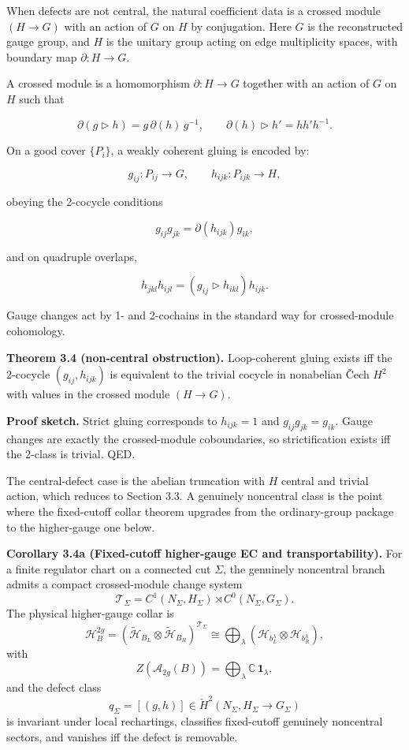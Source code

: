 When defects are not central, the natural coefficient data is a crossed module \((H \to G)\) with an action of \(G\) on \(H\) by conjugation. Here \(G\) is the reconstructed gauge group, and \(H\) is the unitary group acting on edge multiplicity spaces, with boundary map \(\partial: H \to G\).

A crossed module is a homomorphism \(\partial: H \to G\) together with an action of \(G\) on \(H\) such that

\[
\partial(g \triangleright h) = g\,\partial(h)\,g^{-1},
\qquad
\partial(h) \triangleright h' = h h' h^{-1}.
\]

On a good cover \(\{P_i\}\), a weakly coherent gluing is encoded by:

\[
g_{ij}: P_{ij} \to G,\qquad h_{ijk}: P_{ijk} \to H,
\]

obeying the 2-cocycle conditions

\[
g_{ij} g_{jk} = \partial(h_{ijk}) g_{ik},
\]

and on quadruple overlaps,

\[
h_{jkl} h_{ijl} = (g_{ij} \triangleright h_{ikl}) h_{ijk}.
\]

Gauge changes act by 1- and 2-cochains in the standard way for crossed-module cohomology.

\textbf{Theorem 3.4 (non-central obstruction).} Loop-coherent gluing exists iff the 2-cocycle \((g_{ij}, h_{ijk})\) is equivalent to the trivial cocycle in nonabelian \v{C}ech \(H^2\) with values in the crossed module \((H \to G)\).

\textbf{Proof sketch.} Strict gluing corresponds to \(h_{ijk}=1\) and \(g_{ij}g_{jk}=g_{ik}\). Gauge changes are exactly the crossed-module coboundaries, so strictification exists iff the 2-class is trivial. QED.

The central-defect case is the abelian truncation with \(H\) central and trivial action, which reduces to Section 3.3. A genuinely noncentral class is the point where the fixed-cutoff collar theorem upgrades from the ordinary-group package to the higher-gauge one below.

\textbf{Corollary 3.4a (Fixed-cutoff higher-gauge EC and transportability).} For a finite regulator chart on a connected cut \(\Sigma\), the genuinely noncentral branch admits a compact crossed-module change system
\[
\mathcal T_\Sigma
=
C^1(N_\Sigma,H_\Sigma)\rtimes C^0(N_\Sigma,G_\Sigma).
\]
The physical higher-gauge collar is
\[
\mathcal H_B^{2g}
=
(\widetilde{\mathcal H}_{B_L}\otimes \widetilde{\mathcal H}_{B_R})^{\mathcal T_\Sigma}
\cong
\bigoplus_\lambda
(\mathcal H_{b_L^\lambda}\otimes \mathcal H_{b_R^\lambda}),
\]
with
\[
Z(\mathcal A_{2g}(B))
=
\bigoplus_\lambda \mathbb C\,\mathbf 1_\lambda,
\]
and the defect class
\[
q_\Sigma=[(g,h)]\in \check H^2(N_\Sigma,H_\Sigma\to G_\Sigma)
\]
is invariant under local rechartings, classifies fixed-cutoff genuinely noncentral sectors, and vanishes iff the defect is removable.

